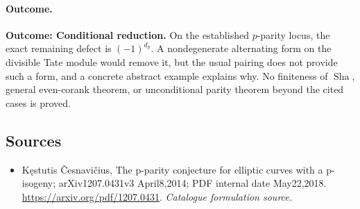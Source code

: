 \documentclass[11pt,a4paper]{article}
\numberwithin{equation}{section}
\begin{document}
\paragraph{Outcome.}
\textbf{Outcome: Conditional reduction.}
On the established $p$-parity locus, the exact remaining defect is $(-1)^{d_p}$. A nondegenerate alternating form on the divisible Tate module would remove it, but the usual pairing does not provide such a form, and a concrete abstract example explains why. No finiteness of $\operatorname{Sha}$, general even-corank theorem, or unconditional parity theorem beyond the cited cases is proved.

\subsection{Sources}
\begin{itemize}\raggedright
\item[\textnormal{[S1]}]\hypertarget{source:196:1}{} Kęstutis Česnavičius, The p-parity conjecture for elliptic curves with a p-isogeny; arXiv1207.0431v3 April8,2014; PDF internal date May22,2018.
\url{https://arxiv.org/pdf/1207.0431}.
{\small\textit{Catalogue formulation source.}}
\end{itemize}
\end{document}
